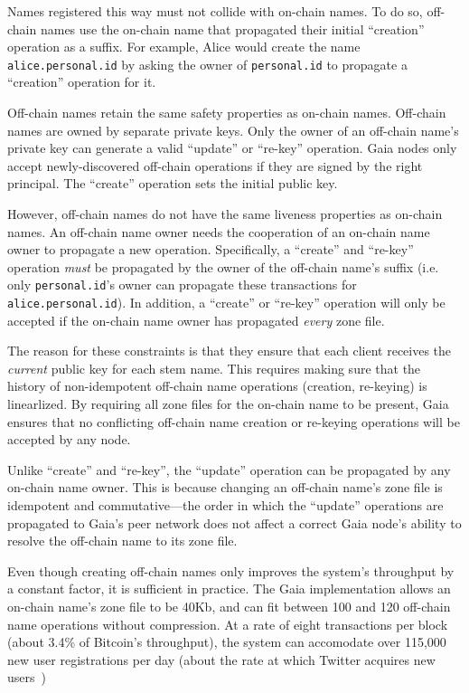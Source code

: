 Names registered this way must not collide with on-chain names.  To do so, 
off-chain names use the on-chain name that propagated their initial
``creation'' operation as a suffix.  For example, Alice would create the name
\texttt{alice.personal.id} by asking the owner of \texttt{personal.id} to
propagate a ``creation'' operation for it.
 
Off-chain names retain the same safety properties as on-chain names.  Off-chain
names are owned by separate private keys.  Only the owner of an off-chain name's
private key can generate a valid ``update'' or ``re-key'' operation.  Gaia nodes
only accept newly-discovered off-chain operations if they are signed by the
right principal.  The ``create'' operation sets the initial public key.

However, off-chain names do not have the same liveness properties as on-chain
names.  An off-chain name owner needs the cooperation of an on-chain name owner
to propagate a new operation.  Specifically, a ``create'' and ``re-key''
operation \emph{must} be propagated by the owner of the off-chain name's suffix
(i.e. only \texttt{personal.id}'s owner can propagate these transactions for
\texttt{alice.personal.id}).  In addition, a ``create'' or ``re-key'' operation
will only be accepted if the on-chain name owner has propagated \emph{every}
zone file.

The reason for these constraints is that they ensure that each client receives
the \emph{current} public key for each stem name.  This requires making sure
that the history of non-idempotent off-chain name operations (creation, re-keying) is
linearlized.  By requiring all zone files
for the on-chain name to be present, Gaia ensures that no conflicting off-chain name
creation or re-keying operations will be accepted by any node.

Unlike ``create'' and ``re-key'', the ``update'' operation can be propagated by
any on-chain name owner.  This is because changing an off-chain name's zone file
is idempotent and commutative---the order in which the ``update''
operations are propagated to Gaia's peer network does not affect a correct
Gaia node's ability to resolve the off-chain name to its zone file.

Even though creating off-chain names only improves the system's throughput by 
a constant factor, it is sufficient in practice.  The Gaia implementation
allows an on-chain name's zone file to be 40Kb, and can fit between
100 and 120 off-chain name operations without compression.
At a rate of eight transactions per block (about 3.4\% of Bitcoin's throughput),
the system can accomodate over 115,000 new user registrations
per day (about the rate at which Twitter acquires
new users~\cite{twitter-user-acquisition})  %

